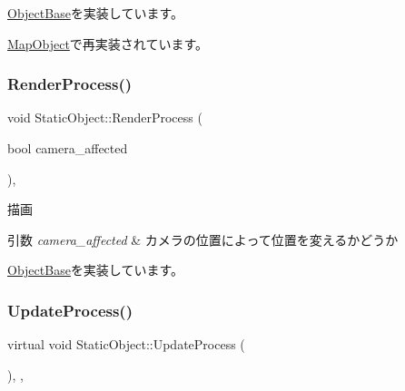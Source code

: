 \mbox{\hyperlink{class_object_base_af133f36f2bca1dcfd962e2cfac61ab51}{Object\+Base}}を実装しています。



\mbox{\hyperlink{class_map_object_a3043cddb8aaad0eab27a076e9bee0284}{Map\+Object}}で再実装されています。

\mbox{\label{class_static_object_afec57009537695c4715386120a619942}} 
\subsubsection{\texorpdfstring{Render\+Process()}{RenderProcess()}}
{\footnotesize\ttfamily void Static\+Object\+::\+Render\+Process (\begin{DoxyParamCaption}\item[{bool}]{camera\+\_\+affected }\end{DoxyParamCaption})\hspace{0.3cm}{\ttfamily [protected]}, {\ttfamily [virtual]}}



描画 


\begin{DoxyParams}{引数}
{\em camera\+\_\+affected} & カメラの位置によって位置を変えるかどうか \\
\hline
\end{DoxyParams}


\mbox{\hyperlink{class_object_base_aeac51d868beeb7f7fe900407b76b93a2}{Object\+Base}}を実装しています。

\mbox{\label{class_static_object_a7fa678c3c4032bb6e9417f93a8bb895c}} 
\subsubsection{\texorpdfstring{Update\+Process()}{UpdateProcess()}}
{\footnotesize\ttfamily virtual void Static\+Object\+::\+Update\+Process (\begin{DoxyParamCaption}{ }\end{DoxyParamCaption})\hspace{0.3cm}{\ttfamily [inline]}, {\ttfamily [protected]}, {\ttfamily [virtual]}}



